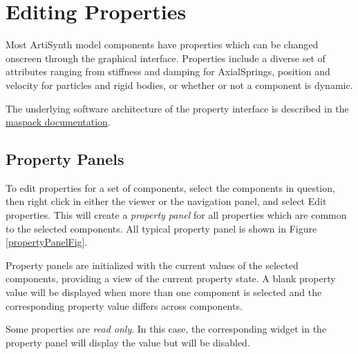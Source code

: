 \documentclass{article}
\begin{document}
\section{Editing Properties}

Most ArtiSynth model components have properties which can be 
changed onscreen through the graphical interface. Properties
include a diverse set of attributes ranging from stiffness and
damping for AxialSprings, position and velocity for particles and
rigid bodies, or whether or not a component is dynamic.

The underlying software architecture of the property interface is 
described in the 
\href{\artisynthDocBase/html/maspack/maspack.html#Properties}{maspack documentation}.

\subsection{Property Panels}
\label{propertyPanelsSec}

To edit properties for a set of components, select the components in
question, then right click in either the viewer or the navigation
panel, and select {\sf Edit properties}. This will create a {\it property
panel} for all properties which are common to the selected components.
All typical property panel is shown in Figure \ref{propertyPanelFig}.

Property panels are initialized with the current values of the selected
components, providing a view of the current property state. A blank
property value will be displayed when more than one component is selected and 
the corresponding property value differs across components.

Some properties are {\it read only}. In this case, the corresponding
widget in the property panel will display the value but will be
disabled.
\end{document}
